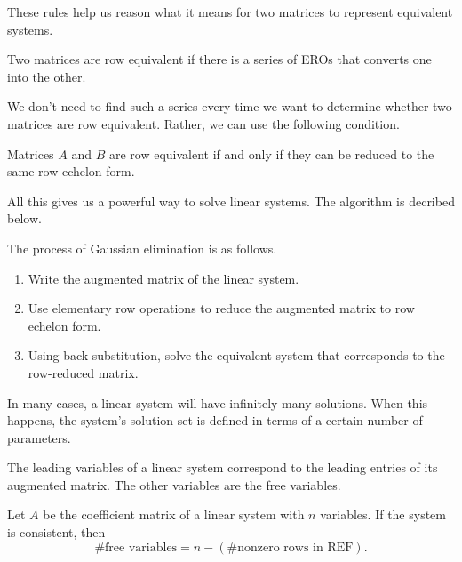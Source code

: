 \documentclass[../m73main.tex]{subfiles}
\begin{document}
These rules help us reason what it means for two matrices to represent equivalent systems.

\begin{definition}
	Two matrices are row equivalent if there is a series of EROs that converts one into the other.
\end{definition}

We don't need to find such a series every time we want to determine whether two matrices are row equivalent.
Rather, we can use the following condition.

\begin{theorem}
	Matrices $A$ and $B$ are row equivalent if and only if they can be reduced to the same row echelon form.
\end{theorem}

All this gives us a powerful way to solve linear systems.
The algorithm is decribed below.

\begin{definition}
	The process of Gaussian elimination is as follows.
	\begin{enumerate}
		\item Write the augmented matrix of the linear system.
		\item Use elementary row operations to reduce the augmented matrix to row echelon form.
		\item Using back substitution, solve the equivalent system that corresponds to the row-reduced matrix.
	\end{enumerate}
\end{definition}

In many cases, a linear system will have infinitely many solutions.
When this happens, the system's solution set is defined in terms of a certain number of parameters.

\begin{definition}
	The leading variables of a linear system correspond to the leading entries of its augmented matrix.
	The other variables are the free variables.
\end{definition}

\begin{theorem}
	Let $A$ be the coefficient matrix of a linear system with $n$ variables.
	If the system is consistent, then
	\[ \text{\# free variables} = n - (\text{\# nonzero rows in REF}). \]
\end{theorem}
\end{document}
